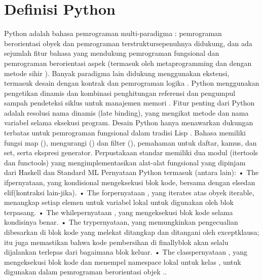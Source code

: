\section{Definisi Python}
Python adalah bahasa pemrograman multi-paradigma : pemrograman berorientasi obyek dan pemrograman terstruktursepenuhnya didukung, dan ada sejumlah fitur bahasa yang mendukung pemrograman fungsional dan pemrograman berorientasi aspek (termasuk oleh metaprogramming dan dengan metode sihir ).  Banyak paradigma lain didukung menggunakan ekstensi, termasuk desain dengan kontrak  dan pemrograman logika .
Python menggunakan pengetikan dinamis dan kombinasi penghitungan referensi dan pengumpul sampah pendeteksi siklus untuk manajemen memori . Fitur penting dari Python adalah resolusi nama dinamis (late binding), yang mengikat metode dan nama variabel selama eksekusi program.
Desain Python hanya menawarkan dukungan terbatas untuk pemrograman fungsional dalam tradisi Lisp . Bahasa memiliki fungsi map (), mengurangi () dan filter (), pemahaman untuk daftar, kamus, dan set, serta ekspresi generator. Perpustakaan standar memiliki dua modul (itertools dan functools) yang mengimplementasikan alat-alat fungsional yang dipinjam dari Haskell dan Standard ML 
Pernyataan Python termasuk (antara lain):
•	The ifpernyataan, yang kondisional mengeksekusi blok kode, bersama dengan elsedan elif(kontraksi lain-jika).
•	The forpernyataan , yang iterates atas obyek iterable, menangkap setiap elemen untuk variabel lokal untuk digunakan oleh blok terpasang.
•	The whilepernyataan , yang mengeksekusi blok kode selama kondisinya benar.
•	The trypernyataan, yang memungkinkan pengecualian dibesarkan di blok kode yang melekat ditangkap dan ditangani oleh exceptklausa; itu juga memastikan bahwa kode pembersihan di finallyblok akan selalu dijalankan terlepas dari bagaimana blok keluar.
•	The classpernyataan , yang mengeksekusi blok kode dan menempel namespace lokal untuk kelas , untuk digunakan dalam pemrograman berorientasi objek .\cite{van2007python}.

